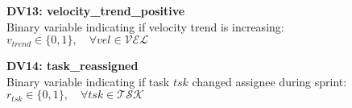 \documentclass[12pt]{article}
\begin{document}
    \item \textbf{DV13: velocity\_trend\_positive} \\
    Binary variable indicating if velocity trend is increasing: \\
    $v_{trend} \in \{0,1\}, \quad \forall vel \in \mathcal{VEL}$

    \item \textbf{DV14: task\_reassigned} \\
    Binary variable indicating if task $tsk$ changed assignee during sprint: \\
    $r_{tsk} \in \{0,1\}, \quad \forall tsk \in \mathcal{TSK}$
\end{document}
